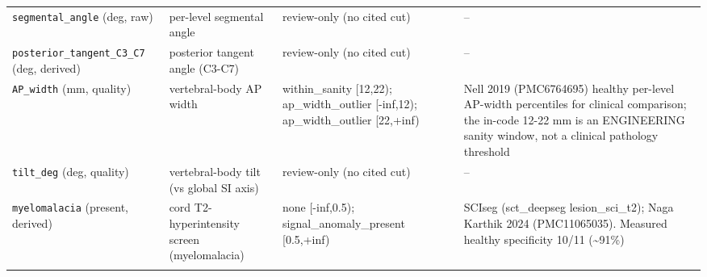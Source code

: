 \begin{center}
\begin{longtable}{p{2.6cm} p{3.3cm} p{4.5cm} p{4.4cm}}
\addlinespace
\texttt{segmental\_angle} (deg, raw) & per-level segmental angle & review-only (no cited cut) & -- \\
\addlinespace
\texttt{posterior\_tangent\_C3\_C7} (deg, derived) & posterior tangent angle (C3-C7) & review-only (no cited cut) & -- \\
\addlinespace
\texttt{AP\_width} (mm, quality) & vertebral-body AP width & within\_sanity [12,22); ap\_width\_outlier [-inf,12); ap\_width\_outlier [22,+inf) & Nell 2019 (PMC6764695) healthy per-level AP-width percentiles for clinical comparison; the in-code 12-22 mm is an ENGINEERING sanity window, not a clinical pathology threshold \\
\addlinespace
\texttt{tilt\_deg} (deg, quality) & vertebral-body tilt (vs global SI axis) & review-only (no cited cut) & -- \\
\addlinespace
\texttt{myelomalacia} (present, derived) & cord T2-hyperintensity screen (myelomalacia) & none [-inf,0.5); signal\_anomaly\_present [0.5,+inf) & SCIseg (sct\_deepseg lesion\_sci\_t2); Naga Karthik 2024 (PMC11065035). Measured healthy specificity 10/11 (\textasciitilde{}91\%) \\
\addlinespace
\bottomrule
\end{longtable}
\end{center}

